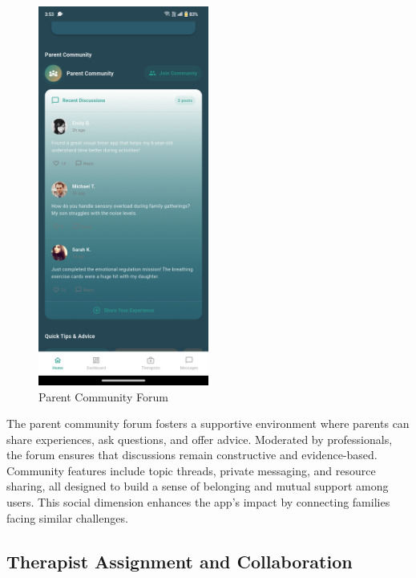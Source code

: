 \documentclass[12pt,a4paper]{article}
\newcommand{\sectiontitle}[1]{\subsection{#1}}
\begin{document}
\begin{figure}[H]
    \centering
    \includegraphics[width=0.5\textwidth]{Screenshots/parentcommunity.png}
    \caption{Parent Community Forum}
    \label{fig:parent-community}
\end{figure}
The parent community forum fosters a supportive environment where parents can share experiences, ask questions, and offer advice. Moderated by professionals, the forum ensures that discussions remain constructive and evidence-based. Community features include topic threads, private messaging, and resource sharing, all designed to build a sense of belonging and mutual support among users. This social dimension enhances the app's impact by connecting families facing similar challenges.

\sectiontitle{Therapist Assignment and Collaboration}
\end{document}
